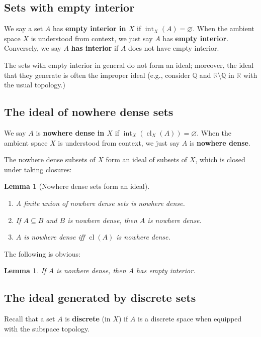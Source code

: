 \documentclass[11pt]{amsart}
\theoremstyle{plain}
\newtheorem{lemma}[thm]{Lemma}
\theoremstyle{definition}
\numberwithin{equation}{section}
\newcommand\Q{\mathbb{Q}}
\newcommand\R{\mathbb{R}}
\newcommand\0{\varnothing}
\begin{document}
\subsection{Sets with empty interior}
We say a set $A$ has \textbf{empty interior in $X$} if $\operatorname{int}_X(A)=\varnothing$. When the ambient space $X$ is understood from context, we just say $A$ has \textbf{empty interior}. Conversely, we say $A$ \textbf{has interior} if $A$ does not have empty interior.

\medskip\noindent
The sets with empty interior in general do not form an ideal; moreover, the ideal that they generate is often the improper ideal (e.g., consider $\Q$ and $\R\setminus\Q$ in $\R$ with the usual topology.)


\subsection{The ideal of nowhere dense sets}
We say $A$ is \textbf{nowhere dense in $X$} if $\operatorname{int}_X(\operatorname{cl}_X(A))=\varnothing$. When the ambient space $X$ is understood from context, we just say $A$ is \textbf{nowhere dense}.


\medskip\noindent
The nowhere dense subsets of $X$ form an ideal of subsets of $X$, which is closed under taking closures:

\begin{lemma}[Nowhere dense sets form an ideal]\label{nowheredense_ideal_properties}
\hfill\begin{enumerate}
\item\label{nowheredense_ideal_union} A finite union of nowhere dense sets is nowhere dense.
\item\label{nowheredense_downward_closed} If $A\subseteq B$ and $B$ is nowhere dense, then $A$ is nowhere dense.
\item\label{nowheredense_closure} $A$ is nowhere dense iff $\operatorname{cl}(A)$ is nowhere dense.
\end{enumerate}
\end{lemma}

\noindent
The following is obvious:
\begin{lemma}\label{nowhere_dense_implies_empty_interior}
If $A$ is nowhere dense, then $A$ has empty interior.
\end{lemma}


\subsection{The ideal generated by discrete sets}
 Recall that a set $A$ is \textbf{discrete} (in $X$) if $A$ is a discrete space when equipped with the subspace topology. 
\end{document}
